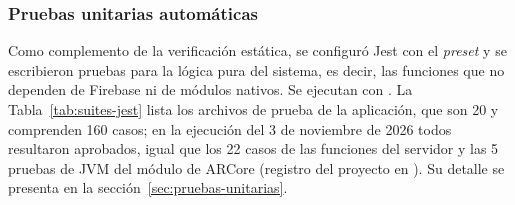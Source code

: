 \subsubsection{Pruebas unitarias automáticas}
\label{sec:estab-jest}

Como complemento de la verificación estática, se configuró Jest con el
\emph{preset}  y se escribieron pruebas para la lógica pura
del sistema, es decir, las funciones que no dependen de Firebase ni de módulos
nativos. Se ejecutan con . La
Tabla~\ref{tab:suites-jest} lista los archivos de prueba de la aplicación, que
son 20 y comprenden 160 casos; en la ejecución del 3 de noviembre de 2026 todos
resultaron aprobados, igual que los 22 casos de las funciones del servidor y las
5 pruebas de JVM del módulo de ARCore (registro del proyecto en
). Su detalle se presenta en la
sección~\ref{sec:pruebas-unitarias}. 

